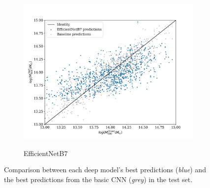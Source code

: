 \begin{figure}[H]
\begin{subfigure}{.325\textwidth}
    \includegraphics[width=\linewidth]{images/Chapter4/Results/test_EfficientNetB7_scatter.png}
    \label{fig:test_EfficientNetB7_scatter}
    \caption{EfficientNetB7}
\end{subfigure}
\caption{Comparison between each deep model's best predictions (\textit{blue}) and the best predictions from the basic CNN (\textit{grey}) in the test set.}
\end{figure}

